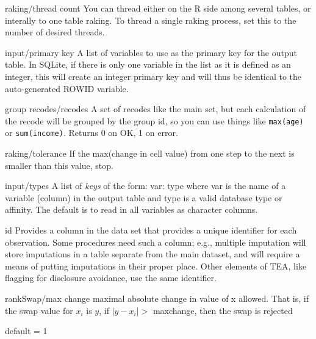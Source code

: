 \begin{key}{raking/thread count}
 You can thread either on the R side among several tables,
     or interally to one table raking. To thread a single raking process, set this to the
     number of desired threads. 
     
\end{key}

\begin{key}{input/primary key}
 A list of variables to use as the primary key for the output table.
In SQLite, if there is only one variable in the list as it is defined as an integer,
this will create an integer primary key and will thus be identical to the auto-generated
ROWID variable.
\end{key}

\begin{key}{group recodes/recodes}
 A set of recodes like the main set, but each calculation of the recode will be grouped by the group id, so you can use things like {\tt max(age)} or {\tt sum(income)}.
Returns 0 on OK, 1 on error.

\end{key}

\begin{key}{    raking/tolerance}
     If the max(change in cell value) from one step to the next
       is smaller than this value, stop. 
\end{key}

\begin{key}{input/types}
 A list of \emph{keys} of the form:
var: type
where var is the name of a variable (column) in the output table and type is a valid
database type or affinity.  The default is to read in all variables as character
columns.
\end{key}

\begin{key}{id}
 Provides a column in the data set that provides a unique identifier for each
observation.
Some procedures need such a column; e.g., multiple imputation will store imputations in a
table separate from the main dataset, and will require a means of putting imputations in
their proper place. Other elements of TEA, like flagging for disclosure avoidance, use the
same identifier.
\end{key}

\begin{key}{rankSwap/max change}
 maximal absolute change in value of x allowed.
That is, if the swap value for $x_i$ is $y$, if $|y - x_i| >$ maxchange,
then the swap is rejected

default = 1
\end{key}

